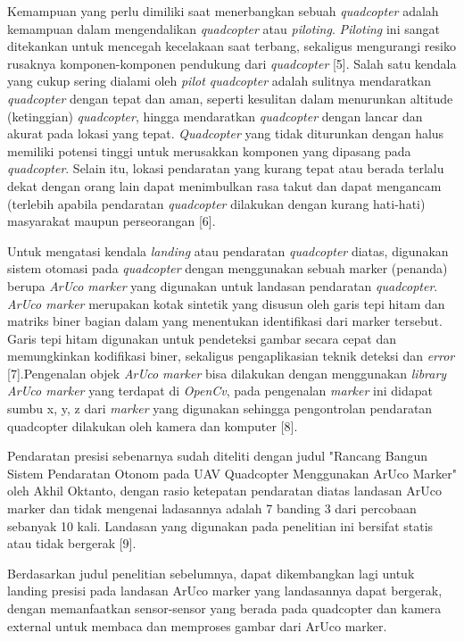 Kemampuan yang perlu dimiliki saat menerbangkan sebuah \textit{quadcopter} adalah kemampuan dalam mengendalikan \textit{quadcopter} atau \textit{piloting}. \textit{Piloting} ini sangat ditekankan untuk mencegah kecelakaan saat terbang, sekaligus mengurangi resiko rusaknya komponen-komponen pendukung dari \textit{quadcopter} [5]. Salah satu kendala yang cukup sering dialami oleh \textit{pilot quadcopter} adalah sulitnya mendaratkan \textit{quadcopter} dengan tepat dan aman, seperti kesulitan dalam menurunkan altitude (ketinggian) \textit{quadcopter}, hingga mendaratkan \textit{quadcopter} dengan lancar dan akurat pada lokasi yang tepat. \textit{Quadcopter} yang tidak diturunkan dengan halus memiliki potensi tinggi untuk merusakkan komponen yang dipasang pada \textit{quadcopter}. Selain itu, lokasi pendaratan yang kurang tepat atau berada terlalu dekat dengan orang lain dapat menimbulkan rasa takut dan dapat mengancam (terlebih apabila pendaratan \textit{quadcopter} dilakukan dengan kurang hati-hati) masyarakat maupun perseorangan [6].

Untuk mengatasi kendala \textit{landing} atau pendaratan \textit{quadcopter} diatas, digunakan sistem otomasi pada \textit{quadcopter} dengan menggunakan sebuah marker (penanda) berupa \textit{ArUco marker} yang digunakan untuk landasan pendaratan \textit{quadcopter}. \textit{ArUco marker} merupakan kotak sintetik yang disusun oleh garis tepi hitam dan matriks biner bagian dalam yang menentukan identifikasi dari marker tersebut. Garis tepi hitam digunakan untuk pendeteksi gambar secara cepat dan memungkinkan kodifikasi biner, sekaligus pengaplikasian teknik deteksi dan \textit{error} [7].Pengenalan objek \textit{ArUco marker} bisa dilakukan dengan menggunakan \textit{library} \textit{ArUco marker} yang terdapat di \textit{OpenCv}, pada pengenalan \textit{marker} ini didapat sumbu x, y, z dari \textit{marker} yang digunakan sehingga pengontrolan  pendaratan quadcopter dilakukan oleh kamera dan komputer [8]. 

Pendaratan presisi sebenarnya sudah diteliti dengan judul "Rancang Bangun Sistem Pendaratan Otonom pada UAV Quadcopter Menggunakan ArUco Marker" oleh Akhil Oktanto, dengan rasio ketepatan pendaratan diatas landasan ArUco marker dan tidak mengenai ladasannya adalah 7 banding 3 dari percobaan sebanyak 10 kali. Landasan yang digunakan pada penelitian ini bersifat statis atau tidak bergerak [9].

Berdasarkan judul penelitian sebelumnya, dapat dikembangkan lagi untuk landing presisi pada landasan ArUco marker yang landasannya dapat bergerak, dengan memanfaatkan sensor-sensor yang berada pada quadcopter dan kamera external untuk membaca dan memproses gambar dari ArUco marker. 

